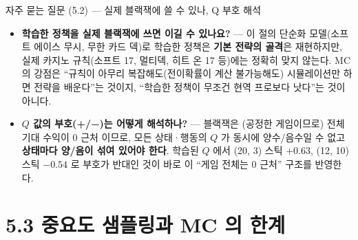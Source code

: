 \documentclass[aspectratio=169,11pt]{beamer}
\begin{document}
\begin{frame}{자주 묻는 질문 (5.2) --- 실제 블랙잭에 쓸 수
있나, Q 부호 해석}
  \begin{itemize}
    \item \textbf{학습한 정책을 실제 블랙잭에 쓰면 이길 수
      있나요?} --- 이 절의 단순화 모델(소프트 에이스 무시,
      무한 카드 덱)로 학습한 정책은 \textbf{기본 전략의
      골격}은 재현하지만, 실제 카지노 규칙(소프트 17,
      멀티덱, 히트 온 17 등)에는 정확히 맞지 않는다. MC 의
      강점은 ``규칙이 아무리 복잡해도(전이확률이 계산
      불가능해도) 시뮬레이션만 하면 전략을 배운다''는 것이지,
      ``학습한 정책이 무조건 현역 프로보다 낫다''는 것이
      아니다.
    \item \textbf{$Q$ 값의 부호(+/−)는 어떻게 해석하나?} ---
      블랙잭은 (공정한 게임이므로) 전체 기대 수익이 0 근처
      이므로, 모든 상태·행동의 $Q$ 가 동시에 양수/음수일 수
      없고 \textbf{상태마다 양/음이 섞여 있어야 한다}. 학습된
      $Q$ 에서 (20, 3) 스틱 $+0.63$, (12, 10) 스틱 $-0.54$ 로
      부호가 반대인 것이 바로 이 ``게임 전체는 0 근처''
      구조를 반영한다.
  \end{itemize}
\end{frame}

\section{5.3 중요도 샘플링과 MC 의 한계}

\end{document}
